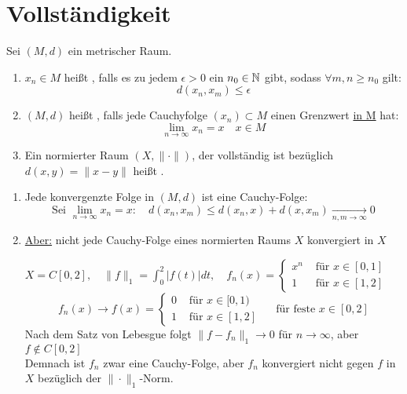 
\section{Vollst{\"a}ndigkeit}

\begin{definition}
	Sei $(M, d)$ ein metrischer Raum.
	\begin{enumerate}[label=\alph*\upshape)]
		\item $x_{n} \in M$ hei{\ss}t , falls es zu jedem $\epsilon > 0$ ein $n_{0} \in \mathbb{N}$ gibt, sodass $\forall m, n \geq n_{0}$ gilt:
			\[ d(x_{n}, x_{m}) \leq \epsilon \]
		\item $(M, d)$ hei{\ss}t , falls jede Cauchyfolge $(x_{n}) \subset M$ einen Grenzwert \uline{in M} hat:
			\[ \lim_{n \rightarrow \infty} x_{n} = x \quad x \in M \]
		\item Ein normierter Raum $(X, \| \cdot \|)$, der vollständig ist bezüglich $d(x, y) = \| x - y \|$ heißt .
	\end{enumerate}
\end{definition}

\begin{bemerkung}
	\begin{enumerate}[label=\alph*\upshape)]
		\item Jede konvergenzte Folge in $(M, d)$ ist eine Cauchy-Folge:
			\[ \text{Sei } \lim_{n \rightarrow \infty} x_{n} = x: \quad d(x_{n}, x_{m}) \leq d(x_{n}, x) + d(x, x_{m}) \xrightarrow[n, m \rightarrow \infty]{} 0 \]
		\item \uline{Aber:} nicht jede Cauchy-Folge eines normierten Raums $X$ konvergiert in $X$
			\begin{beispiel*}
				$X = C[0, 2], \quad \| f \|_{1} = \int_{0}^{2} | f(t) | dt, \quad
				f_{n}(x) = \begin{cases}x^{n} & \text{ für } x \in [0, 1] \\ 1 & \text{ für } x \in [1, 2]\end{cases}$	
				\[ f_{n}(x) \rightarrow f(x) = \begin{cases} 0 & \text{ für } x \in [0, 1) \\ 1 & \text{ für } x \in [1, 2] \end{cases} \quad \text{ für feste } x \in [0, 2] \]
				Nach dem Satz von Lebesgue folgt $\| f - f_{n} \|_{1} \rightarrow 0$ für $n \rightarrow \infty$, aber $f \notin C[0, 2]$ \\
				Demnach ist $f_{n}$ zwar eine Cauchy-Folge, aber $f_{n}$ konvergiert nicht gegen $f$ in $X$ bezüglich der $\| \cdot \|_{1}$-Norm.
			\end{beispiel*}
	\end{enumerate}	
\end{bemerkung}

